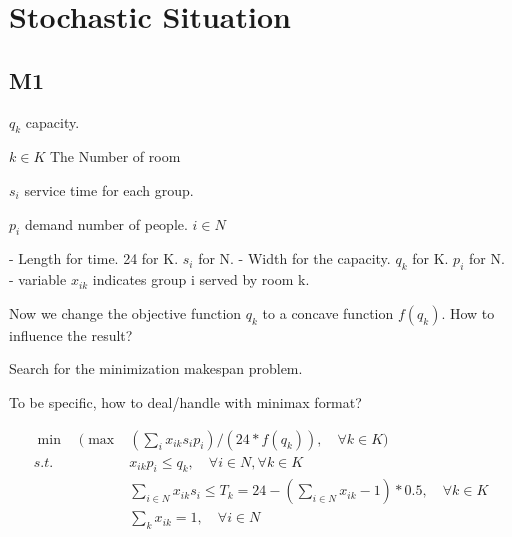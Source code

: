 \section{Stochastic Situation}
\subsection{M1}
$q_k$ capacity. 

$k\in K$  The Number of room

$s_i$ service time for each group.

$p_i$ demand number of people.  $i \in N$

- Length for time.          24 for K. $s_i$ for N.
- Width for the capacity.   $q_k$ for K. $p_i$  for N.
- variable $x_{ik}$ indicates group i served by room k.

Now we change the objective function $q_k$ to a concave function $f(q_k)$. How to influence the result?

Search for the minimization makespan problem. 

To be specific, how to deal/handle with minimax format?




$$
\begin{aligned}
\min \quad (\max & (\sum_i { x_{ik} s_i p_i})/(24 * f(q_k)),\quad \forall k \in K) \\
s.t. \quad  & x_{ik} p_i \leq q_k,\quad  \forall i \in N, \forall k \in K  \\
& \sum_{i\in N} x_{ik} s_i \leq T_k = 24 - (\sum_{i\in N} x_{ik} - 1)*0.5,\quad \forall k \in K \\
& \sum_{k} x_{ik} =1,\quad \forall i \in N
\end{aligned}$$

